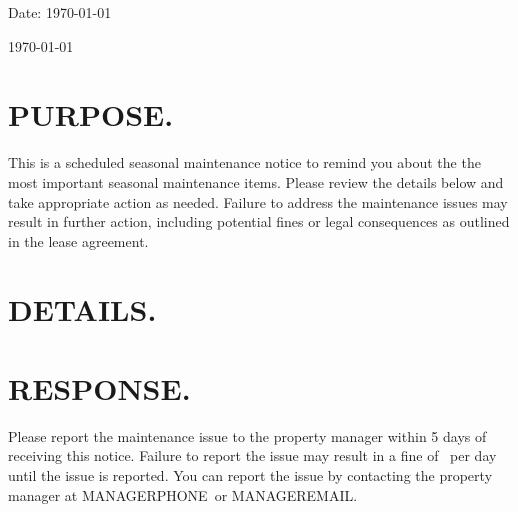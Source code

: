 \documentclass[9pt]{article}
\renewcommand{\ManagerPhone}{{{MANAGERPHONE}}}  %
\renewcommand{\ManagerEmail}{{{MANAGEREMAIL}}}  %
\begin{document}
	\ComputePreLeaseDays %

    Date: \today

	\begin{center}
		\centering {}
	\end{center}
	\hfill \today

	\vspace{0.5cm}
	\noticeinfo{}{}

	\section{PURPOSE.}
    This is a scheduled seasonal maintenance notice to remind you about the the most important seasonal maintenance items. Please review the details below and take appropriate action as needed.
    Failure to address the maintenance issues may result in further action, including potential fines or legal consequences as outlined in the lease agreement.

    \section{DETAILS.}
    





    \section{RESPONSE.}
    Please report the maintenance issue to the property manager within 5 days of receiving this notice. Failure to report the issue may result in a fine of \PenaltyFine~per day until the issue is reported. You can report the issue by contacting the property manager at \ManagerPhone~or \ManagerEmail.


	
\end{document}
